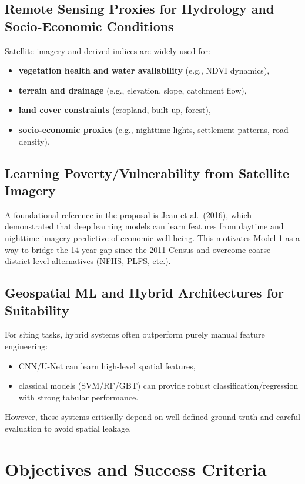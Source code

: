 \documentclass[12pt,a4paper]{report}
\begin{document}
\section{Remote Sensing Proxies for Hydrology and Socio-Economic Conditions}
Satellite imagery and derived indices are widely used for:
\begin{itemize}
  \item \textbf{vegetation health and water availability} (e.g., NDVI dynamics),
  \item \textbf{terrain and drainage} (e.g., elevation, slope, catchment flow),
  \item \textbf{land cover constraints} (cropland, built-up, forest),
  \item \textbf{socio-economic proxies} (e.g., nighttime lights, settlement patterns, road density).
\end{itemize}

\section{Learning Poverty/Vulnerability from Satellite Imagery}
A foundational reference in the proposal is Jean et al.\ (2016), which demonstrated that deep learning models can learn features from daytime and nighttime imagery predictive of economic well-being. This motivates Model 1 as a way to bridge the 14-year gap since the 2011 Census and overcome coarse district-level alternatives (NFHS, PLFS, etc.).

\section{Geospatial ML and Hybrid Architectures for Suitability}
For siting tasks, hybrid systems often outperform purely manual feature engineering:
\begin{itemize}
  \item CNN/U-Net can learn high-level spatial features,
  \item classical models (SVM/RF/GBT) can provide robust classification/regression with strong tabular performance.
\end{itemize}
However, these systems critically depend on well-defined ground truth and careful evaluation to avoid spatial leakage.

\chapter{Objectives and Success Criteria}
\end{document}
